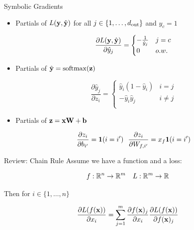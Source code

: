 \documentclass{beamer}
\begin{document}
\begin{frame}{Symbolic Gradients}
  
  \begin{itemize}
  \item 

  Partials of $L(\mathbf{y}, \hat{\mathbf{y}})$ for all $j \in \{1, \ldots, {d_{\mathrm{out}}}\}$ and $y_c = 1$ 

  \[ \frac{\partial L(\mathbf{y}, \hat{\mathbf{y}})}{\partial \hat{y}_j} = \begin{cases}-\frac{1} {\hat{y}_j} & j = c\\ 0 & o.w. \end{cases}  \]
  \pause 

  \item
    Partials of $\hat{\boldy} = \softmax(\boldz)$ 

  \[ \frac{\partial \hat{y}_j }{\partial z_i} =
    \begin{cases}
      \hat{y}_i (1 - \hat{y}_i) & i = j\\
      - \hat{y}_i \hat{y}_j & i \neq j \\
    \end{cases} \]

  \pause 
  \item Partials of $\mathbf{z}  = \mathbf{x} \mathbf{W} + \mathbf{b} $ 

  \[ \frac{\partial z_i }{\partial b_{i'}} = \mathbf{1}(i = i') \ \  \frac{\partial z_i }{\partial W_{f, i'}} = x_f \mathbf{1}(i = i') \]

  \end{itemize}

\end{frame}

\begin{frame}{Review: Chain Rule}
  Assume we have a function and a loss:

  \[ f : \reals^n \rightarrow \reals^m \ \ \  L : \reals^m \rightarrow \reals \] 

  Then for $i \in \{1, \ldots, n \}$

  \[ \frac{\partial L(f(\mathbf{x}))}{\partial x_i} = \sum_{j =1}^m \frac{\partial f(\mathbf{x})_j} {\partial  x_i} \frac{\partial L(f(\mathbf{x}))} {\partial f(\mathbf{x})_j}   \]

  
\end{frame}
\end{document}
